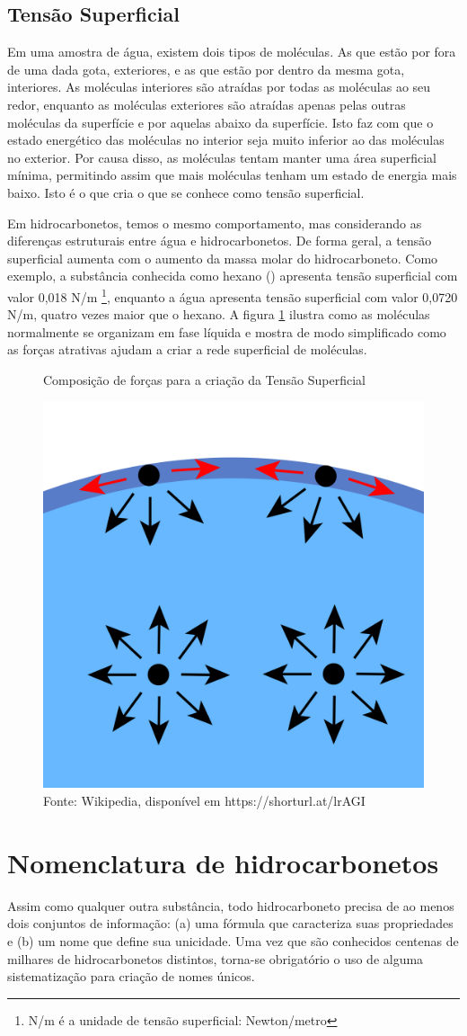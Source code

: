 \subsection{Tensão Superficial}
Em uma amostra de água, existem dois tipos de moléculas. As que estão por fora de uma dada gota, exteriores, e as que estão por dentro da mesma gota, interiores. As moléculas interiores são atraídas por todas as moléculas ao seu redor, enquanto as moléculas exteriores são atraídas apenas pelas outras moléculas da superfície e por aquelas abaixo da superfície. Isto faz com que o estado energético das moléculas no interior seja muito inferior ao das moléculas no exterior. Por causa disso, as moléculas tentam manter uma área superficial mínima, permitindo assim que mais moléculas tenham um estado de energia mais baixo. Isto é o que cria o que se conhece como tensão superficial. 

Em hidrocarbonetos, temos o mesmo comportamento, mas considerando as diferenças estruturais entre água e hidrocarbonetos. De forma geral, a tensão superficial aumenta com o aumento da massa molar do hidrocarboneto. Como exemplo, a substância conhecida como hexano () apresenta tensão superficial com valor 0,018 N/m \footnote{N/m é a unidade de tensão superficial: Newton/metro}, enquanto a água apresenta tensão superficial com valor 0,0720 N/m, quatro vezes maior que o hexano. A figura \ref{fig:ts} ilustra como as moléculas normalmente se organizam em fase líquida e mostra de modo simplificado como as forças atrativas ajudam a criar a rede superficial de moléculas.

\begin{figure}[H]
	\centering
	\caption{Composição de forças para a criação da Tensão Superficial}
	\includegraphics[width=0.35\linewidth]{imagens/ts.png}
	\caption*{Fonte: Wikipedia, disponível em https://shorturl.at/lrAGI}
\label{fig:ts}
\end{figure}

\section{Nomenclatura de hidrocarbonetos}
Assim como qualquer outra substância, todo hidrocarboneto precisa de ao menos dois conjuntos de informação: (a) uma fórmula que caracteriza suas propriedades e (b) um nome que define sua unicidade. Uma vez que são conhecidos centenas de milhares de hidrocarbonetos distintos, torna-se obrigatório o uso de alguma sistematização para criação de nomes únicos.

